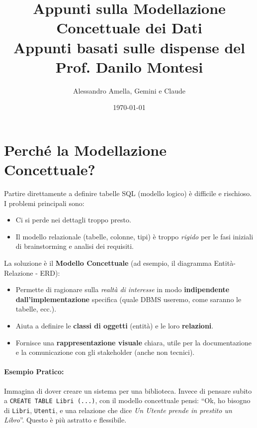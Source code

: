 

\usepackage{hyperref}

\title{Appunti sulla Modellazione Concettuale dei Dati\\
  \large Appunti basati sulle dispense del Prof. Danilo Montesi}
\author{Alessandro Amella, Gemini e Claude}
\date{\today}


	
	\maketitle
	\tableofcontents
	\newpage
	
	\section{Perché la Modellazione Concettuale?}
	
	Partire direttamente a definire tabelle SQL (modello logico) è difficile e rischioso. I problemi principali sono:
	\begin{itemize}
		\item Ci si perde nei dettagli troppo presto.
		\item Il modello relazionale (tabelle, colonne, tipi) è troppo \textit{rigido} per le fasi iniziali di brainstorming e analisi dei requisiti.
	\end{itemize}
	
	La soluzione è il \textbf{Modello Concettuale} (ad esempio, il diagramma Entità-Relazione - ERD):
	\begin{itemize}
		\item Permette di ragionare sulla \textit{realtà di interesse} in modo \textbf{indipendente dall'implementazione} specifica (quale DBMS useremo, come saranno le tabelle, ecc.).
		\item Aiuta a definire le \textbf{classi di oggetti} (entità) e le loro \textbf{relazioni}.
		\item Fornisce una \textbf{rappresentazione visuale} chiara, utile per la documentazione e la comunicazione con gli stakeholder (anche non tecnici).
	\end{itemize}
	
	\paragraph{Esempio Pratico:} Immagina di dover creare un sistema per una biblioteca. Invece di pensare subito a \texttt{CREATE TABLE Libri (...)}, con il modello concettuale pensi: ``Ok, ho bisogno di \texttt{Libri}, \texttt{Utenti}, e una relazione che dice \textit{Un Utente prende in prestito un Libro}''. Questo è più astratto e flessibile.
	

